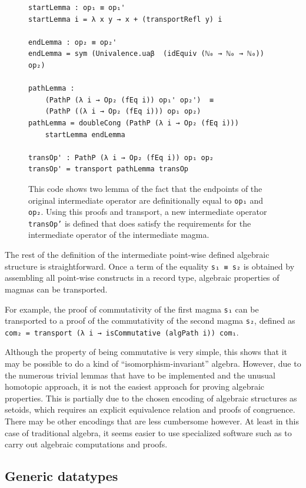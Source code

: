 \documentclass[11pt,a4paper,twoside,xetex,draft]{book}
\begin{document}
\begin{figure}\label{adaptedOp}
 \centering
\begin{BVerbatim}
startLemma : op₁ ≡ op₁'
startLemma i = λ x y → x + (transportRefl y) i

endLemma : op₂ ≡ op₂'
endLemma = sym (Univalence.uaβ  (idEquiv (ℕ₀ → ℕ₀ → ℕ₀)) op₂)

pathLemma : 
    (PathP (λ i → Op₂ (fEq i)) op₁' op₂')  ≡  
    (PathP ((λ i → Op₂ (fEq i))) op₁ op₂)
pathLemma = doubleCong (PathP (λ i → Op₂ (fEq i))) 
    startLemma endLemma

transOp' : PathP (λ i → Op₂ (fEq i)) op₁ op₂
transOp' = transport pathLemma transOp
\end{BVerbatim}

\caption{This code shows two lemma of the fact that the endpoints of the original intermediate operator are definitionally equal to \texttt{op₁} and \texttt{op₂}. Using this proofs and transport, a new intermediate operator \texttt{transOp'} is defined that does satisfy the requirements for the intermediate operator of the intermediate magma.}   
\end{figure}

The rest of the definition of the intermediate point-wise defined algebraic structure is straightforward. Once a term of the equality \texttt{s₁ ≡ s₂} is obtained by assembling all point-wise constructs in a record type, algebraic properties of magmas can be transported. 

For example, the proof of commutativity of the first magma \texttt{s₁} can be transported to a proof of the commutativity of the second magma \texttt{s₂}, defined as \texttt{com₂ = transport (λ i → isCommutative (algPath i)) com₁}. 

Although the property of being commutative is very simple, this shows that it may be possible to do a kind of ``isomorphism-invariant'' algebra. However, due to the numerous trivial lemmas that have to be implemented and the unusual homotopic approach, it is not the easiest approach for proving algebraic properties. This is partially due to the chosen encoding of algebraic structures as setoids, which requires an explicit equivalence relation and proofs of congruence. There may be other encodings that are less cumbersome however. At least in this case of traditional algebra, it seems easier to use specialized software such as \cite{TheGAPGroup2018} to carry out algebraic computations and proofs.

\subsection{Generic datatypes}
\end{document}
